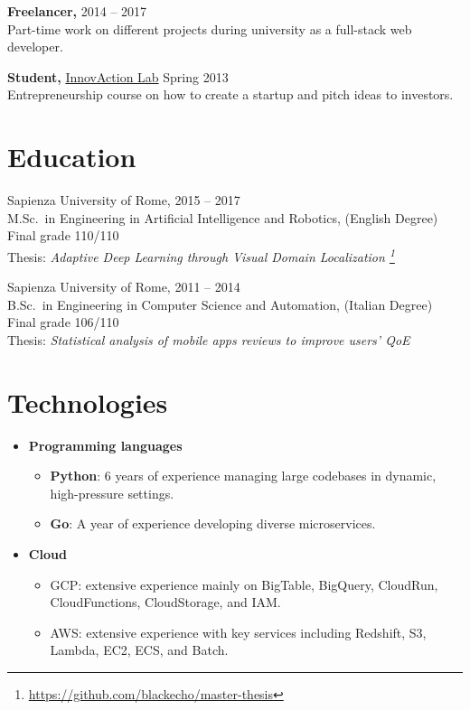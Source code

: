 \documentclass[margin]{res}
\begin{document}
\begin{resume}
            {\bf Freelancer,} \hfill 2014 -- 2017\\
            Part-time work on different projects during university as a full-stack web developer.

            {\bf Student,} \href{http://www.innovactionlab.org/?lang=en}{InnovAction Lab} \hfill Spring 2013\\
            Entrepreneurship course on how to create a startup and pitch ideas to investors.

        \section{Education}
            Sapienza University of Rome, \hfill 2015 -- 2017 \\
            M.Sc.\ in Engineering in Artificial Intelligence and Robotics, (English Degree) \\
            Final grade 110/110 \\
            Thesis: \textit{Adaptive Deep Learning through Visual Domain Localization \footnote{\url{https://github.com/blackecho/master-thesis}}}

            Sapienza University of Rome, \hfill 2011 -- 2014 \\
            B.Sc.\ in Engineering in Computer Science and Automation, (Italian Degree) \\
            Final grade 106/110 \\
            Thesis: \textit{Statistical analysis of mobile apps reviews to improve users' QoE}

        \section{Technologies}
        \begin{itemize}
            \item \textbf{Programming languages}
            \begin{itemize}
                \item \textbf{Python}: 6 years of experience managing large codebases in dynamic, high-pressure settings.
                \item \textbf{Go}: A year of experience developing diverse microservices.
            \end{itemize}

            \item \textbf{Cloud}
            \begin{itemize}
                \item GCP: extensive experience mainly on BigTable, BigQuery, CloudRun, CloudFunctions, CloudStorage, and IAM.
                \item AWS: extensive experience with key services including Redshift, S3, Lambda, EC2, ECS, and Batch.
            \end{itemize}


\end{itemize}
\end{resume}
\end{document}
